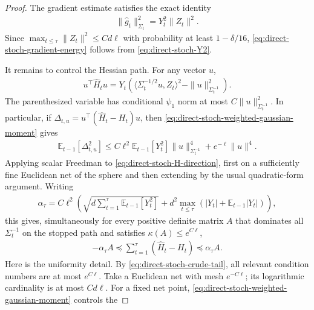 \documentclass{article}
\theoremstyle{plain}
\theoremstyle{definition}
\theoremstyle{plain}
\newcommand{\E}{\mathbb E}
\begin{document}
\begin{proof}
    The gradient estimate satisfies the exact identity
    \begin{align}
        \|\widehat g_t\|_{\Sigma_t}^2
        =Y_t^2\|Z_t\|^2.
    \end{align}
    Since $\max_{t\leq\tau}\|Z_t\|^2\leq Cd\ell$ with probability
    at least $1-\delta/16$, \eqref{eq:direct-stoch-gradient-energy}
    follows from \eqref{eq:direct-stoch-Y2}.

    It remains to control the Hessian path.  For any vector $u$,
    \begin{align}
        u^\top\widehat H_tu
        =Y_t\left(
        \langle\Sigma_t^{-1/2}u,Z_t\rangle^2
        -\|u\|_{\Sigma_t^{-1}}^2
        \right).
        \label{eq:direct-stoch-H-direction}
    \end{align}
    The parenthesized variable has conditional $\psi_1$ norm at most
    $C\|u\|_{\Sigma_t^{-1}}^2$.  In particular, if
    $\Delta_{t,u}=u^\top(\widehat H_t-H_t)u$, then
    \eqref{eq:direct-stoch-weighted-gaussian-moment} gives
    \begin{align}
        \E_{t-1}[\Delta_{t,u}^2]
        \leq
        C\ell^2\E_{t-1}[Y_t^2]
        \|u\|_{\Sigma_t^{-1}}^4
        +e^{-\ell}\|u\|^4.
        \label{eq:direct-stoch-H-direction-variance}
    \end{align}
    Applying scalar Freedman to
    \eqref{eq:direct-stoch-H-direction}, first on a sufficiently fine
    Euclidean net of the sphere and then extending by the usual
    quadratic-form argument.  Writing
    \begin{align}
        \alpha_\tau
        =C\ell^2\left(
        \sqrt{d\sum_{t=1}^{\tau}\E_{t-1}[Y_t^2]}
        +d^2\max_{t\leq\tau}
        (|Y_t|+\E_{t-1}|Y_t|)
        \right),
    \end{align}
    this gives, simultaneously for every positive definite matrix $A$ that
    dominates all $\Sigma_t^{-1}$ on the stopped path and satisfies
    $\kappa(A)\leq e^{C\ell}$,
    \begin{align}
        -\alpha_\tau A
        \preceq
        \sum_{t=1}^{\tau}(\widehat H_t-H_t)
        \preceq
        \alpha_\tau A.
        \label{eq:direct-stoch-H-Freedman}
    \end{align}
    Here is the uniformity detail.  By
    \eqref{eq:direct-stoch-crude-tail}, all relevant condition numbers
    are at most $e^{C\ell}$.  Take a Euclidean net with mesh
    $e^{-C\ell}$; its logarithmic cardinality is at most $Cd\ell$.
    For a fixed net point,
    \eqref{eq:direct-stoch-weighted-gaussian-moment} controls the

\end{proof}
\end{document}

